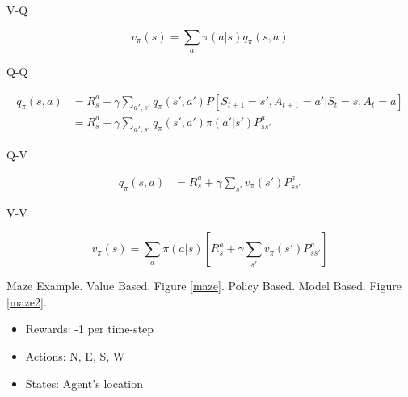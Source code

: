 \documentclass[english]{article}
\begin{document}
V-Q

$$v_\pi(s) = \sum_{a} \pi(a|s) q_\pi(s,a)$$

Q-Q

\begin{align*}
q_\pi(s,a) &= R_s^a +\gamma 
\sum_{a',s'} q_\pi(s',a')
P[S_{t+1}=s',A_{t+1} = a'|S_t = s, A_t=a]\\
&= R_s^a +\gamma 
\sum_{a',s'} q_\pi(s',a')
\pi(a'|s')P_{ss'}^a
\end{align*}

Q-V

\begin{align*}
q_\pi(s,a) &= R_s^a +\gamma 
\sum_{s'} v_\pi(s')P_{ss'}^a
\end{align*}

V-V

$$v_\pi(s) 
= \sum_{a} 
\pi(a|s) 
[R_s^a +\gamma 
\sum_{s'} v_\pi(s')P_{ss'}^a]$$




\item {Maze Example}. {Value Based}. Figure \ref{maze}. {Policy Based}. {Model Based}. Figure \ref{maze2}.


\begin{itemize}
    \item Rewards: -1 per time-step
    \item Actions: N, E, S, W
    \item States: Agent's location
\end{itemize}
\end{document}
